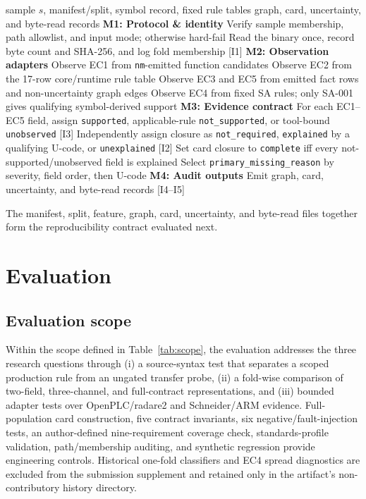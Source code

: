 \documentclass[a4paper,fleqn]{cas-dc}
\begin{document}
\begin{algorithm}[tbp]
\caption{Evidence-card construction}
\label{alg:evidence_card}
\begin{algorithmic}[1]
\Require sample $s$, manifest/split, symbol record, fixed rule tables
\Ensure graph, card, uncertainty, and byte-read records
\Statex \textbf{M1: Protocol \& identity}
\State Verify sample membership, path allowlist, and input mode; otherwise hard-fail
\State Read the binary once, record byte count and SHA-256, and log fold membership [I1]
\Statex \textbf{M2: Observation adapters}
\State Observe EC1 from \texttt{nm}-emitted function candidates
\State Observe EC2 from the 17-row core/runtime rule table
\State Observe EC3 and EC5 from emitted fact rows and non-uncertainty graph edges
\State Observe EC4 from fixed SA rules; only SA-001 gives qualifying symbol-derived support
\Statex \textbf{M3: Evidence contract}
\State For each EC1--EC5 field, assign \texttt{supported}, applicable-rule \texttt{not\_supported}, or tool-bound \texttt{unobserved} [I3]
\State Independently assign closure as \texttt{not\_required}, \texttt{explained} by a qualifying U-code, or \texttt{unexplained} [I2]
\State Set card closure to \texttt{complete} iff every not-supported/unobserved field is explained
\State Select \texttt{primary\_missing\_reason} by severity, field order, then U-code
\Statex \textbf{M4: Audit outputs}
\State Emit graph, card, uncertainty, and byte-read records [I4--I5]
\end{algorithmic}
\end{algorithm}

The manifest, split, feature, graph, card, uncertainty, and byte-read files together form the reproducibility contract evaluated next.



\section{Evaluation}

\subsection{Evaluation scope}

Within the scope defined in Table~\ref{tab:scope}, the evaluation addresses the three research questions through (i) a source-syntax test that separates a scoped production rule from an ungated transfer probe, (ii) a fold-wise comparison of two-field, three-channel, and full-contract representations, and (iii) bounded adapter tests over OpenPLC/radare2 and Schneider/ARM evidence. Full-population card construction, five contract invariants, six negative/fault-injection tests, an author-defined nine-requirement coverage check, standards-profile validation, path/membership auditing, and synthetic regression provide engineering controls. Historical one-fold classifiers and EC4 spread diagnostics are excluded from the submission supplement and retained only in the artifact's non-contributory history directory.
\end{document}

